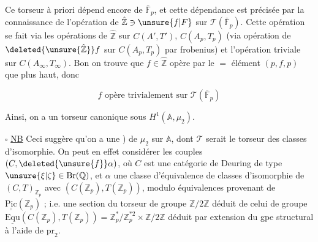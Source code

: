 
Ce torseur à priori dépend encore de $\bar{\mathbb F}_p$,  et cette
dépendance est précisée par la connaissance de l'opération
de $\hat{\mathbb Z}\ni\unsure{f|F}$ sur $\mathcal T(\bar{\mathbb F}_p)$. Cette opération se fait via
les opérations de $\hat{\mathbb Z}$ sur $C(A',T')$,   $C(A_p,T_p)$
(via opération de $\deleted{\unsure{\hat{\mathbb Z}}}f$ sur $C(A_p,T_p)$ par frobenius) et
l'opération triviale sur $C(A_\infty,T_\infty)$. Bon on trouve que
$f\in\hat{\mathbb Z}$ opère par le $=$ élément $(p,f,p)$ que plus
haut, donc

\[
f\text{ opère trivialement sur }\mathcal T(\bar{\mathbb F}_p)
\]

Ainsi, on a un torseur canonique  sous $H^1(\mathbb A,\mu_2)$.

$\square$ \uline{NB} Ceci suggère qu'on a une  
) de  $\mu_2$ sur $\mathbb A$, dont $\mathcal T$ serait
le torseur des classes d'isomorphie. On peut
en effet considérer les couples $(C,\deleted{\unsure{f}}\alpha)$, où
$C$ est une catégorie de Deuring de type $\unsure{\xi|\zeta}\in\mathrm{Br}(\mathbb Q)$,  et
$\alpha$ une  classe d'équivalence de classes d'isomorphie
de  $(C,T)_{\mathbb Z_p}$ avec $(C(\mathbb Z_p),T(\mathbb Z_p))$, modulo équivalences
provenant de $\underline{\underline{\mathrm{Pic}}}(\mathbb Z_p)$ ; i.e. une section du torseur de
groupe $\mathbb Z/2\mathbb Z$ déduit de celui de groupe $\underline{\mathrm{Equ}}(C(\mathbb Z_p),T(\mathbb Z_p))=\mathbb Z_p^*/\mathbb Z_p^{*2}\times\mathbb Z/2\mathbb Z$
déduit par extension du gpe structural à l'aide de $\mathrm{pr}_2$.


